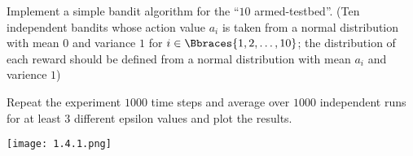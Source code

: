 
\begin{exercise}

Implement a simple bandit algorithm for the \enquote{$10$ armed-testbed}.
(Ten independent bandits whose action value $a_i$ is taken from a normal distribution with mean $0$ and variance $1$ for $i \in \Bbraces{1, 2, \dots, 10}$; the distribution of each reward should be defined from a normal distribution with mean $a_i$ and varience $1$)

Repeat the experiment $1000$ time steps and average over $1000$ independent runs for at least $3$ different epsilon values and plot the results.

\end{exercise}


\begin{solution}

\phantom{}

\begin{center}
    \texttt{[image: 1.4.1.png]}    
\end{center}

\end{solution}

